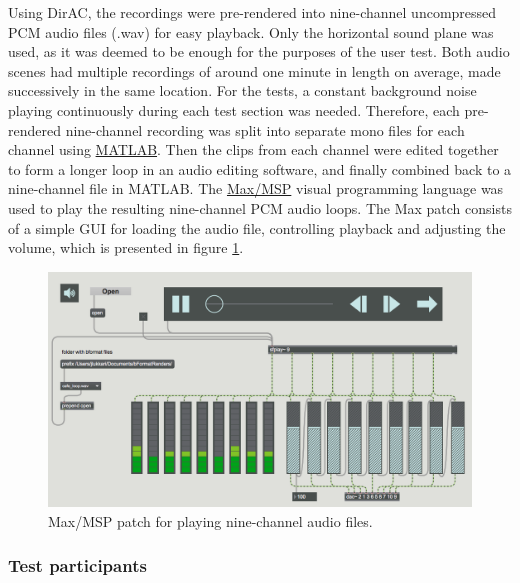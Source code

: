 \documentclass[english, 12pt, a4paper, pdftex, elec, utf8]{aaltothesis}
\begin{document}
Using DirAC, the recordings were pre-rendered into nine-channel uncompressed PCM audio files (.wav) for easy playback. Only the horizontal sound plane was used, as it was deemed to be enough for the purposes of the user test. Both audio scenes had multiple recordings of around one minute in length on average, made successively in the same location. For the tests, a constant background noise playing continuously during each test section was needed. Therefore, each pre-rendered nine-channel recording was split into separate mono files for each channel using \href{https://se.mathworks.com/products/matlab.html}{MATLAB}. Then the clips from each channel were edited together to form a longer loop in an audio editing software, and finally combined back to a nine-channel file in MATLAB. The \href{https://cycling74.com/products/max/}{Max/MSP} visual programming language was used to play the resulting nine-channel PCM audio loops. The Max patch consists of a simple GUI for loading the audio file, controlling playback and adjusting the volume, which is presented in figure \ref{fig:max}. \\
\begin{figure}[h]
    \centering
    \includegraphics[width=\textwidth]{max.png}
    \caption{Max/MSP patch for playing nine-channel audio files.}
    \label{fig:max}
\end{figure}

\subsubsection{Test participants}
\end{document}
